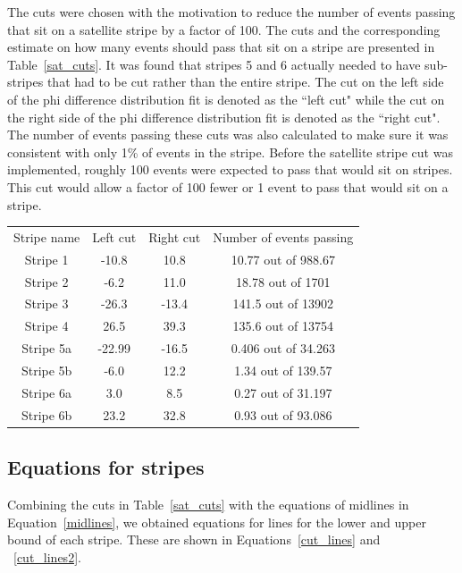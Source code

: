 The cuts were chosen with the motivation to reduce the number of events passing that sit on a satellite stripe by a factor of 100. The cuts and the corresponding estimate on how many events should pass that sit on a stripe are presented in Table~\ref{sat_cuts}. It was found that stripes 5 and 6 actually needed to have sub-stripes that had to be cut rather than the entire stripe. The cut on the left side of the phi difference distribution fit is denoted as the ``left cut" while the cut on the right side of the phi difference distribution fit is denoted as the ``right cut". The number of events passing these cuts was also calculated to make sure it was consistent with only 1\% of events in the stripe.
Before the satellite stripe cut was implemented, roughly 100 events were expected to pass that would sit on stripes. This cut would allow a factor of 100 fewer or 1 event to pass that would sit on a stripe. 

\begin{center}
\begin{tabular}{ c c c c }
 Stripe name & Left cut & Right cut & Number of events passing \\
 Stripe 1  & -10.8  & 10.8  & 10.77 out of 988.67  \\ 
 Stripe 2  & -6.2   & 11.0  & 18.78 out of 1701    \\  
 Stripe 3  & -26.3  & -13.4 & 141.5 out of 13902    \\
 Stripe 4  & 26.5   & 39.3  & 135.6 out of 13754    \\
 Stripe 5a & -22.99 & -16.5 & 0.406 out of 34.263 \\
 Stripe 5b & -6.0   & 12.2  & 1.34 out of 139.57  \\
 Stripe 6a & 3.0    & 8.5   & 0.27 out of 31.197 \\
 Stripe 6b & 23.2   & 32.8  & 0.93 out of 93.086
\end{tabular}
\label{sat_cuts}
\end{center}

\subsection{Equations for stripes}
\label{stripe_eqn}

Combining the cuts in Table~\ref{sat_cuts} with the equations of midlines in Equation~\ref{midlines}, we obtained equations for lines for the lower and upper bound of each stripe. These are shown in Equations~\ref{cut_lines} and ~\ref{cut_lines2}.

